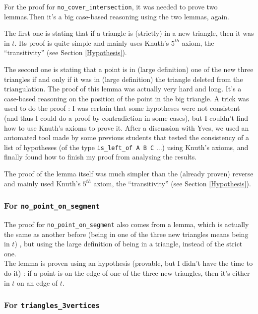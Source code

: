 \documentclass[a4paper,10pt]{article}
\begin{document}
  For the proof for {\tt no\_cover\_intersection}, it was needed to prove two lemmas.Then it's a big case-based reasoning using the two lemmas, again.

  The first one is stating that if a triangle is (strictly) in a new triangle, then it was in $t$.
  Its proof is quite simple and mainly uses Knuth's $5^{th}$ axiom, the ``transitivity'' (see Section \ref{Hypothesis}).
  
  The second one is stating that a point is in (large definition) one of the new three triangles if and only if it was in (large definition) the triangle deleted from the triangulation. The proof of this lemma was actually very hard and long. It's a case-based reasoning on the position of the point in the big triangle. A trick was used to do the proof : I was certain that some hypotheses were not consistent (and thus I could do a proof by contradiction in some cases), but I couldn't find how to use Knuth's axioms to prove it. After a discussion with Yves, we used an automated tool made by some previous students that tested the consistency of a list of hypotheses (of the type {\tt is\_left\_of A B C} ...) using Knuth's axioms, and finally found how to finish my proof from analysing the results.

  
  
  The proof of the lemma itself was much simpler than the (already proven) reverse and mainly used Knuth's $5^{th}$ axiom, the ``transitivity'' (see Section \ref{Hypothesis}).
  
  \subsubsection{For {\tt no\_point\_on\_segment}}

  The proof for {\tt no\_point\_on\_segment} also comes from a lemma, which is actually the same as another before (being in one of the three new triangles means being in $t$) , but using the large definition of being in a triangle, instead of the strict one.\\
  The lemma is proven using an hypothesis (provable, but I didn't have the time to do it) : if a point is on the edge of one of the three new triangles, then it's either in $t$ on an edge of $t$.
  
  \subsubsection{For {\tt triangles\_3vertices}}
\end{document}
